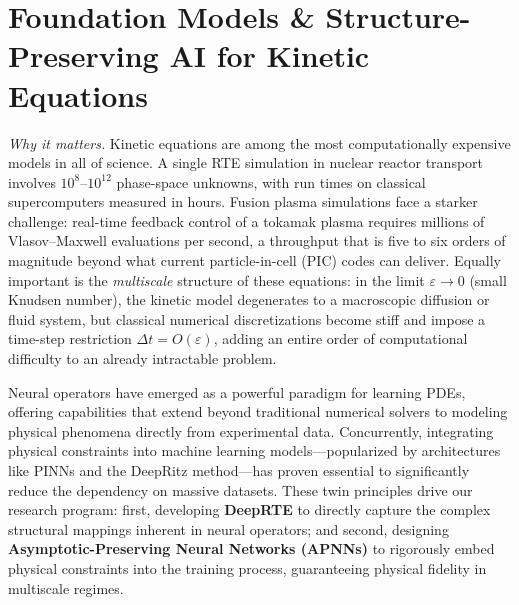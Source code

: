 \section{Foundation Models \& Structure-Preserving AI for Kinetic Equations}

\noindent\textit{Why it matters.}\enspace
Kinetic equations are among the most computationally expensive models in all
of science.  A single RTE simulation in nuclear reactor transport involves
$10^8$--$10^{12}$ phase-space unknowns, with run times on classical
supercomputers measured in hours.  Fusion plasma simulations face a starker
challenge: real-time feedback control of a tokamak plasma requires millions
of Vlasov--Maxwell evaluations per second, a throughput that is five to six
orders of magnitude beyond what current particle-in-cell (PIC) codes can
deliver.  Equally important is the \emph{multiscale} structure of these
equations: in the limit $\varepsilon \to 0$ (small Knudsen number), the
kinetic model degenerates to a macroscopic diffusion or fluid system, but
classical numerical discretizations become stiff and impose a time-step
restriction $\Delta t = O(\varepsilon)$, adding an entire order of
computational difficulty to an already intractable problem.

Neural operators have emerged as a powerful paradigm for learning PDEs, offering capabilities that extend beyond traditional numerical solvers to modeling physical phenomena directly from experimental data. Concurrently, integrating physical constraints into machine learning models---popularized by architectures like PINNs and the DeepRitz method---has proven essential to significantly reduce the dependency on massive datasets. These twin principles drive our research program: first, developing \textbf{DeepRTE} to directly capture the complex structural mappings inherent in neural operators; and second, designing \textbf{Asymptotic-Preserving Neural Networks (APNNs)} to rigorously embed physical constraints into the training process, guaranteeing physical fidelity in multiscale regimes.

